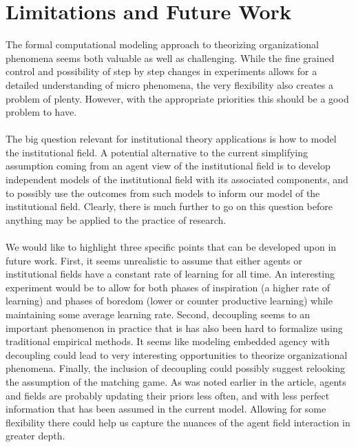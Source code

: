 \documentclass[12pt,letterpaper]{article}
\begin{document}
\section{Limitations and Future Work}
\noindent The formal computational modeling approach to theorizing organizational phenomena seems both valuable as well as challenging. While the fine grained control and possibility of step by step changes in experiments allows for a detailed understanding of micro phenomena, the very flexibility also creates a problem of plenty. However, with the appropriate priorities this should be a good problem to have.\\\\
The big question relevant for institutional theory applications is how to model the institutional field. A potential alternative to the current simplifying assumption coming from an agent view of the institutional field is to develop independent models of the institutional field with its associated components, and to possibly use the outcomes from such models to inform our model of the institutional field. Clearly, there is much further to go on this question before anything may be applied to the practice of research.\\\\
We would like to highlight three specific points that can be developed upon in future work. First, it seems unrealistic to assume that either agents or institutional fields have a constant rate of learning for all time. An interesting experiment would be to allow for both phases of inspiration (a higher rate of learning) and phases of boredom (lower or counter productive learning) while maintaining some average learning rate. Second, decoupling seems to an important phenomenon in practice that is has also been hard to formalize using traditional empirical methods. It seems like modeling embedded agency with decoupling could lead to very interesting opportunities to theorize organizational phenomena. Finally, the inclusion of decoupling could possibly suggest relooking the assumption of the matching game. As was noted earlier in the article, agents and fields are probably updating their priors less often, and with less perfect information that has been assumed in the current model. Allowing for some flexibility there could help us capture the nuances of the agent field interaction in greater depth.\\\\

\end{document}
